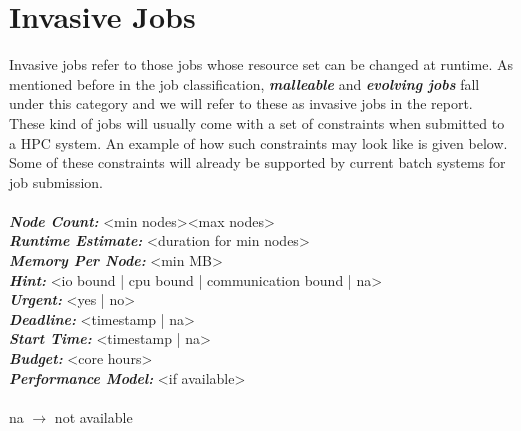 \section{Invasive Jobs}
Invasive jobs refer to those jobs whose resource set can be changed at runtime. As mentioned before in the job classification, \textbf{\textit{malleable}} and \textbf{\textit{evolving jobs}} fall under this category and we will refer to these as invasive jobs in the report. These kind of jobs will usually come with a set of constraints when submitted to a HPC system. An example of how such constraints may look like is given below. Some of these constraints will already be supported by current batch systems for job submission.\\ \\
\textbf{\textit{Node Count:}} <min nodes><max nodes>\\
\textbf{\textit{Runtime Estimate:}} <duration for min nodes>\\
\textbf{\textit{Memory Per Node:}} <min MB>\\
\textbf{\textit{Hint:}} <io bound | cpu bound | communication bound | na>\\
\textbf{\textit{Urgent:}} <yes | no> \\
\textbf{\textit{Deadline:}} <timestamp | na>\\
\textbf{\textit{Start Time:}} <timestamp | na>\\
\textbf{\textit{Budget:}} <core hours>\\
\textbf{\textit{Performance Model:}} <if available>\\ \\
na $\rightarrow$ not available
